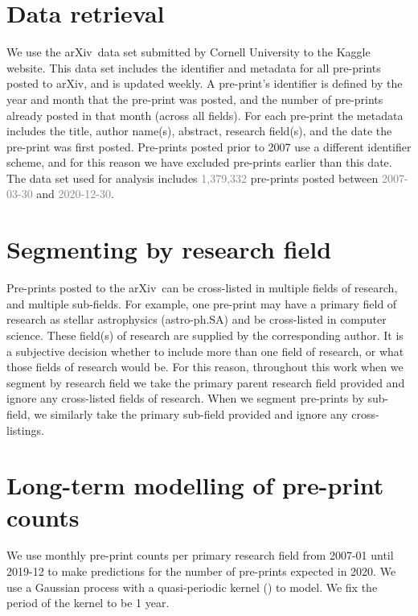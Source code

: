 \documentclass{nature}
\newcommand{\todo}[1]{\textcolor{gray}{#1}}
\newcommand{\arxiv}{arXiv}
\begin{document}
\begin{methods}

\section*{Data retrieval}

We use the \arxiv\ data set\cite{1905.00075} submitted by Cornell University to the Kaggle website. %
This data set includes the identifier and metadata for all pre-prints posted to \arxiv, and is updated weekly. A pre-print's identifier is defined by the year and month that the pre-print was posted, and the number of pre-prints already posted in that month (across all fields). For each pre-print the metadata includes  the title, author name(s), abstract, research field(s), and the date the pre-print was first posted. Pre-prints posted prior to 2007 use a different identifier scheme, and for this reason we have excluded pre-prints earlier than this date. The data set used for analysis includes \todo{1,379,332} pre-prints posted between \todo{2007-03-30} and \todo{2020-12-30}.



\section*{Segmenting by research field}

Pre-prints posted to the \arxiv\ can be cross-listed in multiple fields of research, and multiple sub-fields. For example, one pre-print may have a primary field of research as stellar astrophysics (astro-ph.SA) and be cross-listed in computer science. These field(s) of research are supplied by the corresponding author. It is a subjective decision whether to include more than one field of research, or what those fields of research would be. For this reason, throughout this work when we segment by research field we take the primary parent research field provided and ignore any cross-listed fields of research. When we segment pre-prints by sub-field, we similarly take the primary sub-field provided and ignore any cross-listings.

\section*{Long-term modelling of pre-print counts}

We use monthly pre-print counts per primary research field from 2007-01 until 2019-12 to make predictions for the  number of pre-prints expected in 2020. We use a Gaussian process with a quasi-periodic kernel () to model. We fix the period of the kernel to be 1 year. 




\end{methods}
\end{document}
